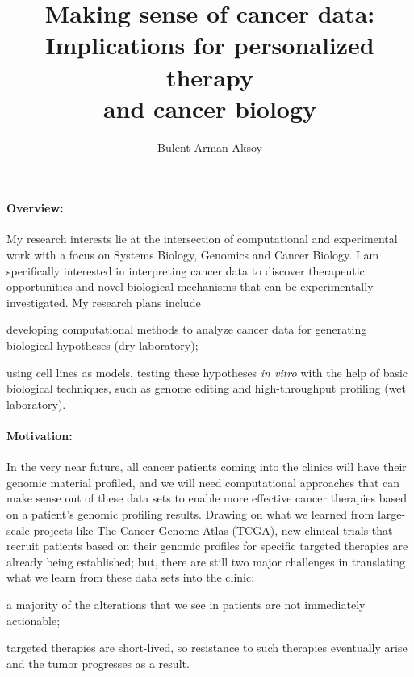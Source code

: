 \documentclass[11pt,letterpaper]{article}
\title{\Large Making sense of cancer data: Implications for personalized therapy \\and cancer biology\vspace{-1ex}%
}
\author{\small Bulent Arman Aksoy}
\date{}
\begin{document}
\maketitle

\paragraph{Overview:}
My research interests lie at the intersection of computational and experimental work with a focus on Systems Biology, Genomics and Cancer Biology.
I am specifically interested in interpreting cancer data to discover therapeutic opportunities and novel biological mechanisms that can be experimentally investigated.
My research plans include
\begin{inparaenum}[(i)]
 \item developing computational methods to analyze cancer data for generating biological hypotheses (dry laboratory);
 \item using cell lines as models, testing these hypotheses \textit{in vitro} with the help of basic biological techniques, such as genome editing and high-throughput profiling (wet laboratory).
\end{inparaenum}

\paragraph{Motivation:}
In the very near future, all cancer patients coming into the clinics will have their genomic material profiled,
and we will need computational approaches that can make sense out of these data sets to enable more effective cancer therapies based on a patient's genomic profiling results.
Drawing on what we learned from large-scale projects like The Cancer Genome Atlas (TCGA), 
new clinical trials that recruit patients based on their genomic profiles for specific targeted therapies are already being established;
but, there are still two major challenges in translating what we learn from these data sets into the clinic:
\begin{inparaenum}[(i)]
 \item a majority of the alterations that we see in patients are not immediately actionable;
 \item targeted therapies are short-lived, so resistance to such therapies eventually arise and the tumor progresses as a result.
\end{inparaenum}
\end{document}
